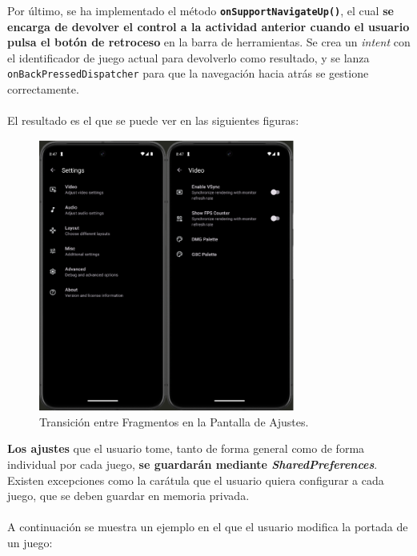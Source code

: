 Por último, se ha implementado el método \textbf{\texttt{onSupportNavigateUp()}}, el cual \textbf{se encarga de devolver el control a la actividad anterior cuando el usuario pulsa el botón de retroceso} en la barra de herramientas. Se crea un \textit{intent} con el identificador de juego actual para devolverlo como resultado, y se lanza \texttt{onBackPressedDispatcher} para que la navegación hacia atrás se gestione correctamente.
\\\\
El resultado es el que se puede ver en las siguientes figuras:

\begin{figure}[H]
    \centering
    \includegraphics[width=0.75\textwidth]{include/images/settings_fragments.png}
    \caption{Transición entre Fragmentos en la Pantalla de Ajustes.}\label{figure:settingsFragments}
\end{figure}

\textbf{Los ajustes} que el usuario tome, tanto de forma general como de forma individual por cada juego, \textbf{se guardarán mediante \textit{SharedPreferences}}. Existen excepciones como la carátula que el usuario quiera configurar a cada juego, que se deben guardar en memoria privada.
\\\\
A continuación se muestra un ejemplo en el que el usuario modifica la portada de un juego:

